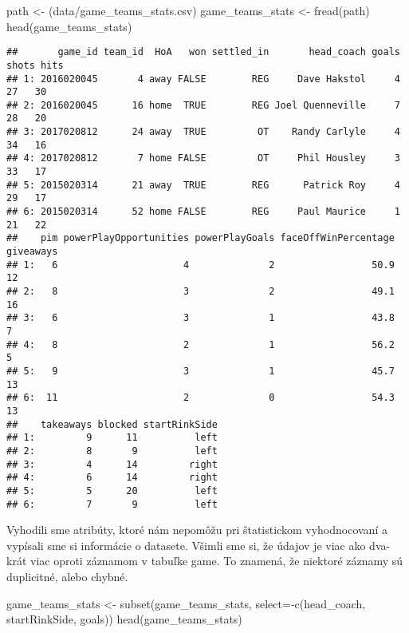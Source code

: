\documentclass[
]{article}
\newenvironment{Shaded}{\begin{snugshade}}{\end{snugshade}}
\newcommand{\AttributeTok}[1]{\textcolor[rgb]{0.77,0.63,0.00}{#1}}
\newcommand{\FunctionTok}[1]{\textcolor[rgb]{0.00,0.00,0.00}{#1}}
\newcommand{\NormalTok}[1]{#1}
\newcommand{\OtherTok}[1]{\textcolor[rgb]{0.56,0.35,0.01}{#1}}
\newcommand{\SpecialCharTok}[1]{\textcolor[rgb]{0.00,0.00,0.00}{#1}}
\newcommand{\StringTok}[1]{\textcolor[rgb]{0.31,0.60,0.02}{#1}}
\begin{document}
\begin{Shaded}
\begin{Highlighting}[]
\NormalTok{path }\OtherTok{\textless{}{-}}\NormalTok{ (}\StringTok{\textquotesingle{}data/game\_teams\_stats.csv\textquotesingle{}}\NormalTok{)}
\NormalTok{game\_teams\_stats }\OtherTok{\textless{}{-}} \FunctionTok{fread}\NormalTok{(path)}
\FunctionTok{head}\NormalTok{(game\_teams\_stats)}
\end{Highlighting}
\end{Shaded}

\begin{verbatim}
##       game_id team_id  HoA   won settled_in       head_coach goals shots hits
## 1: 2016020045       4 away FALSE        REG     Dave Hakstol     4    27   30
## 2: 2016020045      16 home  TRUE        REG Joel Quenneville     7    28   20
## 3: 2017020812      24 away  TRUE         OT    Randy Carlyle     4    34   16
## 4: 2017020812       7 home FALSE         OT     Phil Housley     3    33   17
## 5: 2015020314      21 away  TRUE        REG      Patrick Roy     4    29   17
## 6: 2015020314      52 home FALSE        REG     Paul Maurice     1    21   22
##    pim powerPlayOpportunities powerPlayGoals faceOffWinPercentage giveaways
## 1:   6                      4              2                 50.9        12
## 2:   8                      3              2                 49.1        16
## 3:   6                      3              1                 43.8         7
## 4:   8                      2              1                 56.2         5
## 5:   9                      3              1                 45.7        13
## 6:  11                      2              0                 54.3        13
##    takeaways blocked startRinkSide
## 1:         9      11          left
## 2:         8       9          left
## 3:         4      14         right
## 4:         6      14         right
## 5:         5      20          left
## 6:         7       9          left
\end{verbatim}

Vyhodili sme atribúty, ktoré nám nepomôžu pri štatistickom vyhodnocovaní
a vypísali sme si informácie o datasete. Všimli sme si, že údajov je
viac ako dva-krát viac oproti záznamom v tabuľke game. To znamená, že
niektoré záznamy sú duplicitné, alebo chybné.

\begin{Shaded}
\begin{Highlighting}[]
\NormalTok{game\_teams\_stats }\OtherTok{\textless{}{-}} \FunctionTok{subset}\NormalTok{(game\_teams\_stats, }\AttributeTok{select=}\SpecialCharTok{{-}}\FunctionTok{c}\NormalTok{(head\_coach, startRinkSide, goals))}
\FunctionTok{head}\NormalTok{(game\_teams\_stats)}
\end{Highlighting}
\end{Shaded}
\end{document}
